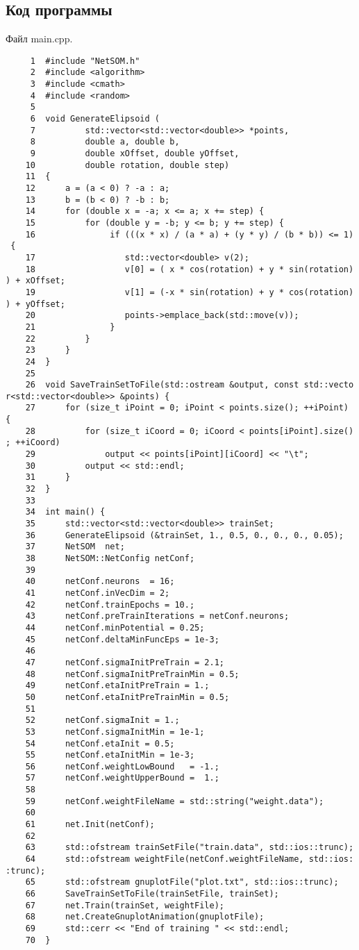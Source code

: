 \subsection{Код программы}
Файл main.cpp.
\begin{verbatim}
     1  #include "NetSOM.h"
     2  #include <algorithm>
     3  #include <cmath>
     4  #include <random>
     5
     6  void GenerateElipsoid (
     7          std::vector<std::vector<double>> *points,
     8          double a, double b,
     9          double xOffset, double yOffset,
    10          double rotation, double step) 
    11  {
    12      a = (a < 0) ? -a : a;
    13      b = (b < 0) ? -b : b;
    14      for (double x = -a; x <= a; x += step) {
    15          for (double y = -b; y <= b; y += step) {
    16               if (((x * x) / (a * a) + (y * y) / (b * b)) <= 1)
 {
    17                  std::vector<double> v(2);
    18                  v[0] = ( x * cos(rotation) + y * sin(rotation)
) + xOffset;
    19                  v[1] = (-x * sin(rotation) + y * cos(rotation)
) + yOffset;
    20                  points->emplace_back(std::move(v));
    21               }
    22          }
    23      }
    24  }
    25
    26  void SaveTrainSetToFile(std::ostream &output, const std::vecto
r<std::vector<double>> &points) {
    27      for (size_t iPoint = 0; iPoint < points.size(); ++iPoint) 
{
    28          for (size_t iCoord = 0; iCoord < points[iPoint].size()
; ++iCoord)
    29              output << points[iPoint][iCoord] << "\t";
    30          output << std::endl;
    31      }
    32  }
    33
    34  int main() {
    35      std::vector<std::vector<double>> trainSet;
    36      GenerateElipsoid (&trainSet, 1., 0.5, 0., 0., 0., 0.05);
    37      NetSOM  net;
    38      NetSOM::NetConfig netConf;
    39
    40      netConf.neurons  = 16;
    41      netConf.inVecDim = 2;
    42      netConf.trainEpochs = 10.;
    43      netConf.preTrainIterations = netConf.neurons;
    44      netConf.minPotential = 0.25;
    45      netConf.deltaMinFuncEps = 1e-3;
    46
    47      netConf.sigmaInitPreTrain = 2.1;
    48      netConf.sigmaInitPreTrainMin = 0.5;
    49      netConf.etaInitPreTrain = 1.;
    50      netConf.etaInitPreTrainMin = 0.5;
    51
    52      netConf.sigmaInit = 1.;
    53      netConf.sigmaInitMin = 1e-1;
    54      netConf.etaInit = 0.5;
    55      netConf.etaInitMin = 1e-3;
    56      netConf.weightLowBound   = -1.;
    57      netConf.weightUpperBound =  1.;
    58
    59      netConf.weightFileName = std::string("weight.data");
    60
    61      net.Init(netConf);
    62
    63      std::ofstream trainSetFile("train.data", std::ios::trunc);
    64      std::ofstream weightFile(netConf.weightFileName, std::ios:
:trunc);
    65      std::ofstream gnuplotFile("plot.txt", std::ios::trunc);
    66      SaveTrainSetToFile(trainSetFile, trainSet);
    67      net.Train(trainSet, weightFile);
    68      net.CreateGnuplotAnimation(gnuplotFile);
    69      std::cerr << "End of training " << std::endl;
    70  }
\end{verbatim}

